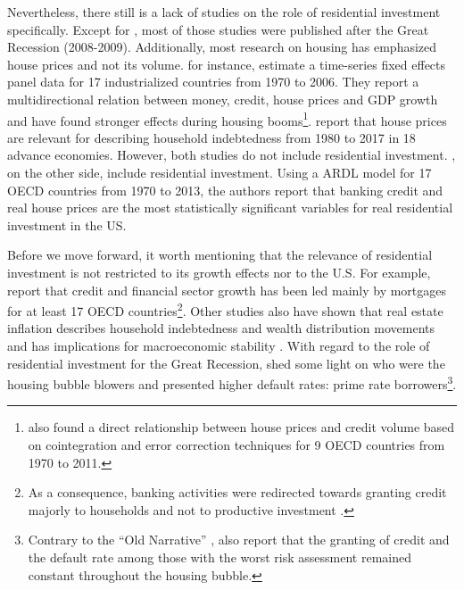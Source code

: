 \documentclass[11pt]{article}
\begin{document}
Nevertheless, there still is a lack of studies on the role of residential investment specifically.
Except for \textcites{green_follow_1997}{leamer_housing_2007}, most of those studies were published after the Great Recession (2008-2009).
Additionally, most research on housing has emphasized house prices and not its volume.
\textcite{goodhart_house_2008} for instance, estimate a time-series fixed effects panel data for 17 industrialized countries from 1970 to 2006. They report a multidirectional relation between money, credit, house prices and GDP growth and have found stronger effects during housing booms\footnote{\textcite{Arestis_Bank_2014} also found a  direct relationship between house prices and credit volume based on cointegration and error correction techniques for 9 OECD countries from 1970 to 2011.}. 
\textcite{wood_house_2020} report that house prices are relevant for describing household indebtedness from 1980 to 2017 in 18 advance economies.
However, both studies do not include residential investment.
\textcite{arestis_residential_2015}, on the other side, include residential investment. Using a ARDL model for 17 OECD countries from 1970 to 2013, the authors report that banking credit and real house prices are the most statistically significant variables for real residential investment in the US.


Before we move forward, it worth mentioning that the relevance of residential investment is not restricted to its growth effects nor to the U.S. 
For example, \textcite{jorda_great_2016} report that credit and financial sector growth has been led mainly by mortgages for at least 17 OECD countries\footnote{As a consequence, banking activities were redirected towards granting credit majorly to households and not to productive investment \cites{erturk_banks_2007}{kohl_more_2018}.}. 
Other studies also have shown that real estate inflation describes household indebtedness and wealth distribution movements and has implications for macroeconomic stability \cites{ryoo_household_2016}{stockhammer_debt-driven_2016}{barnes_private_2016}{johnston_global_2017}{mian_household_2017}{anderson_politics_2020}{fuller_housing_2020}. 
With regard to the role of residential investment for the Great Recession, \textcite{albanesi_credit_2017} shed some light on who were the housing bubble blowers and presented higher default rates: prime rate borrowers\footnote{Contrary to the ``Old Narrative'' \cite{mian_consequences_2009},  \textcite{albanesi_credit_2017}  also report that the granting of credit and the default rate among those with the worst risk assessment remained constant throughout the housing bubble.}.
\end{document}
